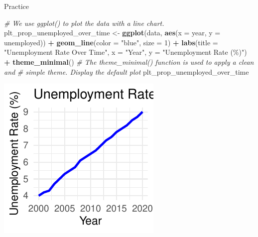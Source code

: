 \documentclass[
  ignorenonframetext,
]{beamer}
\newenvironment{Shaded}{\begin{snugshade}}{\end{snugshade}}
\newcommand{\AttributeTok}[1]{\textcolor[rgb]{0.13,0.29,0.53}{#1}}
\newcommand{\CommentTok}[1]{\textcolor[rgb]{0.56,0.35,0.01}{\textit{#1}}}
\newcommand{\DecValTok}[1]{\textcolor[rgb]{0.00,0.00,0.81}{#1}}
\newcommand{\FunctionTok}[1]{\textcolor[rgb]{0.13,0.29,0.53}{\textbf{#1}}}
\newcommand{\NormalTok}[1]{#1}
\newcommand{\OtherTok}[1]{\textcolor[rgb]{0.56,0.35,0.01}{#1}}
\newcommand{\SpecialCharTok}[1]{\textcolor[rgb]{0.81,0.36,0.00}{\textbf{#1}}}
\newcommand{\StringTok}[1]{\textcolor[rgb]{0.31,0.60,0.02}{#1}}
\begin{document}
\begin{frame}[fragile]{Practice}
\label{practice-2}

\begin{Shaded}
\begin{Highlighting}[]
\CommentTok{\# We use ggplot() to plot the data with a line chart.}
\NormalTok{plt\_prop\_unemployed\_over\_time }\OtherTok{\textless{}{-}} \FunctionTok{ggplot}\NormalTok{(data, }\FunctionTok{aes}\NormalTok{(}\AttributeTok{x =}\NormalTok{ year, }\AttributeTok{y =}\NormalTok{ unemployed)) }\SpecialCharTok{+}
    \FunctionTok{geom\_line}\NormalTok{(}\AttributeTok{color =} \StringTok{"blue"}\NormalTok{, }\AttributeTok{size =} \DecValTok{1}\NormalTok{) }\SpecialCharTok{+} \FunctionTok{labs}\NormalTok{(}\AttributeTok{title =} \StringTok{"Unemployment Rate Over Time"}\NormalTok{,}
    \AttributeTok{x =} \StringTok{"Year"}\NormalTok{, }\AttributeTok{y =} \StringTok{"Unemployment Rate (\%)"}\NormalTok{) }\SpecialCharTok{+} \FunctionTok{theme\_minimal}\NormalTok{()}
\CommentTok{\# The theme\_minimal() function is used to apply a clean and}
\CommentTok{\# simple theme.  Display the default plot}
\NormalTok{plt\_prop\_unemployed\_over\_time}
\end{Highlighting}
\end{Shaded}

\begin{center}\includegraphics[width=0.5\linewidth]{Figs/unnamed-chunk-68-1} \end{center}
\end{frame}
\end{document}
